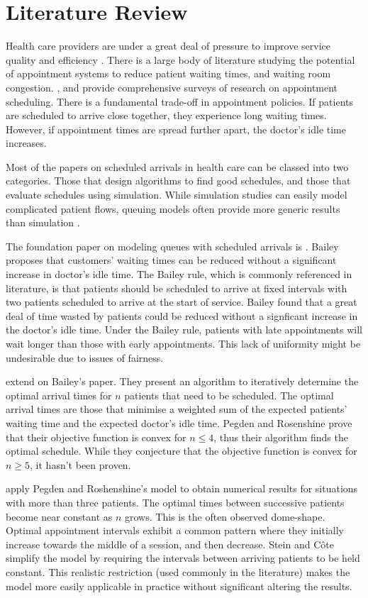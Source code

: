 \chapter{Literature Review}

Health care providers are under a great deal of pressure to improve service quality and efficiency \citep{Goldsmith}. There is a large body of literature studying the potential of appointment systems to reduce patient waiting times, and waiting room congestion. \citet{Fomundam}, and \citet{Cayirli} provide comprehensive surveys of research on appointment scheduling. There is a fundamental trade-off in appointment policies. If patients are scheduled to arrive close together, they experience long waiting times. However, if appointment times are spread further apart, the doctor's idle time increases.

Most of the papers on scheduled arrivals in health care can be classed into two categories. Those that design algorithms to find good schedules, and those that evaluate schedules using simulation. While simulation studies can easily model complicated patient flows, queuing models often provide more generic results than simulation \citep{Green}.

The foundation paper on modeling queues with scheduled arrivals is \citet{Bailey}. Bailey proposes that customers' waiting times can be reduced without a significant increase in doctor's idle time. The Bailey rule, which is commonly referenced in literature, is that patients should be scheduled to arrive at fixed intervals with two patients scheduled to arrive at the start of service. Bailey found that a great deal of time wasted by patients could be reduced without a signficant increase in the doctor's idle time. Under the Bailey rule, patients with late appointments will wait longer than those with early appointments. This lack of uniformity might be undesirable due to issues of fairness. 

\citet{Pegden} extend on Bailey's paper. They present an algorithm to iteratively determine the optimal arrival times for $n$ patients that need to be scheduled. The optimal arrival times are those that minimise a weighted sum of the expected patients' waiting time and the expected doctor's idle time. Pegden and Rosenshine prove that their objective function is convex for $n \leq 4$, thus their algorithm finds the optimal schedule. While they conjecture that the objective function is convex for $n \geq 5$, it hasn't been proven.

\citet{Stein} apply Pegden and Roshenshine's model to obtain numerical results for situations with more than three patients. The optimal times between successive patients become near constant as $n$ grows. This is the often observed dome-shape. Optimal appointment intervals exhibit a common pattern where they initially increase towards the middle of a session, and then decrease. Stein and C\^{o}te simplify the model by requiring the intervals between arriving patients to be held constant. This realistic restriction (used commonly in the literature) makes the model more easily applicable in practice without significant altering the results.

